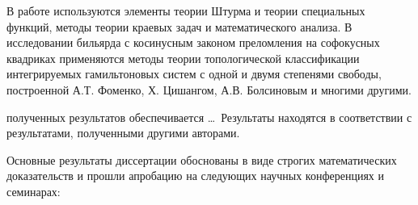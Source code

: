 
%
%
{\methods} В работе используются элементы теории Штурма и теории специальных функций, методы теории краевых задач и математического анализа. В исследовании бильярда с косинусным законом преломления на софокусных квадриках применяются методы теории топологической классификации интегрируемых
гамильтоновых систем с одной и двумя степенями свободы, построенной А.Т. Фоменко, Х. Цишангом, А.В. Болсиновым и многими другими.

{\influence} полученных результатов обеспечивается \ldots \ Результаты находятся в соответствии с результатами, полученными другими авторами.

{\probation}
Основные результаты диссертации обоснованы в виде строгих математических доказательств и прошли апробацию на следующих научных конференциях и семинарах:

